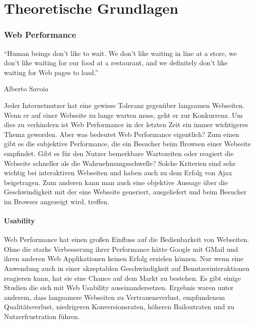 \part{Theoretische Grundlagen}
\label{sec:theory}

\section{Web Performance}
\epigraph{``Human beings don’t like to wait. We don’t like waiting in line at a store, we don’t like waiting for our food at a restaurant, and we definitely don’t like waiting for Web pages to load.''}{Alberto Savoia}

Jeder Internetnutzer hat eine gewisse Toleranz gegenüber langsamen Webseiten. Wenn er auf einer Webseite zu lange warten muss, geht er zur Konkurrenz. Um dies zu verhindern ist Web Performance in der letzten Zeit ein immer wichtigeres Thema geworden. Aber was bedeutet Web Performance eigentlich? Zum einen gibt es die subjektive Performance, die ein Besucher beim Browsen einer Webseite empfindet. Gibt es für den Nutzer bemerkbare Wartezeiten oder reagiert die Webseite schneller als die Wahrnehmungsschwelle? Solche Kriterien sind sehr wichtig bei interaktiven Webseiten und haben auch zu dem Erfolg von Ajax beigetragen. Zum anderen kann man auch eine objektive Aussage über die Geschwindigkeit mit der eine Webseite generiert, ausgeliefert und beim Besucher im Browser angezeigt wird, treffen. 
\subsection{Usability}
Web Performance hat einen großen Einfluss auf die Bedienbarkeit von Webseiten. Ohne die starke Verbesserung ihrer Performance hätte Google mit GMail und ihren anderen Web Applikationen keinen Erfolg erzielen können. Nur wenn eine Anwendung auch in einer akzeptablen Geschwindigkeit auf Benutzerinteraktionen reagieren kann, hat sie eine Chance auf dem Markt zu bestehen. Es gibt einige Studien die sich mit Web Usability auseinandersetzen. Ergebnis waren unter anderem, dass langsamere Webseiten zu Vertrauensverlust, empfundenem Qualitätsverlust, niedrigeren Konversionsraten, höheren Bailoutraten und zu Nutzerfrustration führen.


